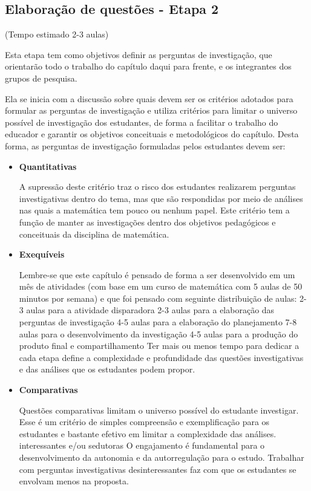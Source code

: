 \clearpage
\def\currentcolor{session1}
\begin{paginatexto}
{
\section{Elaboração de questões - Etapa 2}
(Tempo estimado 2-3 aulas)

Esta etapa tem como objetivos definir as perguntas de investigação, que orientarão todo o trabalho do capítulo daqui para frente, e os integrantes dos grupos de pesquisa. 

Ela se inicia com a discussão sobre quais devem ser os critérios adotados para formular as perguntas de investigação e utiliza critérios para limitar o universo possível de investigação dos estudantes, de forma a facilitar o trabalho do educador e garantir os objetivos conceituais e metodológicos do capítulo. Desta forma, as perguntas de investigação formuladas pelos estudantes devem ser:

\begin{itemize}
\item \textbf{Quantitativas}

A supressão deste critério traz o risco dos estudantes realizarem perguntas investigativas dentro do tema, mas que são respondidas por meio de análises nas quais a matemática tem pouco ou nenhum papel. Este critério tem a função de manter as investigações dentro dos objetivos pedagógicos e conceituais da disciplina de matemática. 

\item \textbf{Exequíveis} 

Lembre-se que este capítulo é pensado de forma a ser desenvolvido em um mês de atividades (com base em um curso de matemática com 5 aulas de 50 minutos por semana) e que foi pensado com seguinte distribuição de aulas: 
2-3 aulas para a atividade disparadora
2-3 aulas para a elaboração das perguntas de investigação
4-5 aulas para a elaboração do planejamento 
7-8 aulas para o desenvolvimento da investigação
4-5 aulas para a produção do produto final e compartilhamento
Ter mais ou menos tempo para dedicar a cada etapa define a complexidade e profundidade das questões investigativas e das análises que os estudantes podem propor.

\item \textbf{Comparativas}

Questões comparativas limitam o universo possível do estudante investigar. Esse é um critério de simples compreensão e exemplificação para os estudantes e bastante efetivo em limitar a complexidade das análises.
interessantes e/ou sedutoras
O engajamento é fundamental para o desenvolvimento da autonomia e da autorregulação para o estudo. Trabalhar com perguntas investigativas desinteressantes faz com que os estudantes se envolvam menos na proposta.


\end{itemize}}
\end{paginatexto}
